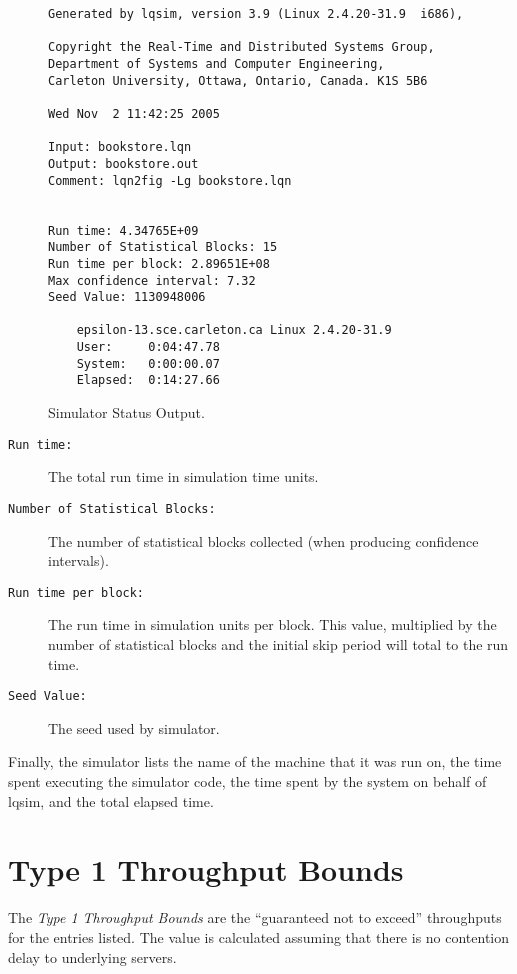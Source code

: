 \begin{figure}[htbp]
  \centering
  \begin{verbatim}
Generated by lqsim, version 3.9 (Linux 2.4.20-31.9  i686),

Copyright the Real-Time and Distributed Systems Group,
Department of Systems and Computer Engineering,
Carleton University, Ottawa, Ontario, Canada. K1S 5B6

Wed Nov  2 11:42:25 2005

Input: bookstore.lqn
Output: bookstore.out
Comment: lqn2fig -Lg bookstore.lqn


Run time: 4.34765E+09
Number of Statistical Blocks: 15
Run time per block: 2.89651E+08
Max confidence interval: 7.32
Seed Value: 1130948006

    epsilon-13.sce.carleton.ca Linux 2.4.20-31.9
    User:     0:04:47.78
    System:   0:00:00.07
    Elapsed:  0:14:27.66
\end{verbatim}
  \caption{Simulator Status Output.}
  \label{fig:output-lqsim}
\end{figure}

\begin{description}
\item[\texttt{Run time:}] The total run time in simulation time units.
\item[\texttt{Number of Statistical Blocks:}] The number of
  statistical blocks collected (when producing
  confidence intervals).  
\item[\texttt{Run time per block:}] The run time in simulation units
  per block.  This value, multiplied by the number of statistical
  blocks and the initial skip period will total to the run time.
\item[\texttt{Seed Value:}] The seed used by simulator.  
\end{description}
Finally, the simulator lists the name of the machine that it was run
on, the time spent executing the simulator code, the time spent by the
system on behalf of lqsim, and the total elapsed time.

\label{sec:model-results}

\section{Type 1 Throughput Bounds}
\label{sec:bounds-out}

The \emph{Type 1 Throughput Bounds} are the ``guaranteed not to
exceed'' throughputs for the entries listed.  The value is calculated
assuming that there is no contention
delay to underlying
servers.

